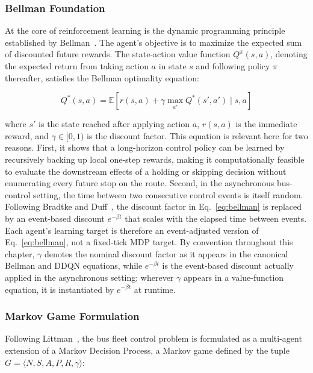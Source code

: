 \subsubsection{Bellman Foundation}

At the core of reinforcement learning is the dynamic programming principle established by Bellman~\cite{Bellman1957}. The agent's objective is to maximize the expected sum of discounted future rewards. The state-action value function $Q^\pi(s,a)$, denoting the expected return from taking action $a$ in state $s$ and following policy $\pi$ thereafter, satisfies the Bellman optimality equation:

\begin{equation}
Q^*(s, a) = \mathbb{E} \left[ r(s, a) + \gamma \max_{a'} Q^*(s', a') \mid s, a \right]
\label{eq:bellman}
\end{equation}

where $s'$ is the state reached after applying action $a$, $r(s,a)$ is the immediate reward, and $\gamma \in [0, 1)$ is the discount factor. This equation is relevant here for two reasons. First, it shows that a long-horizon control policy can be learned by recursively backing up local one-step rewards, making it computationally feasible to evaluate the downstream effects of a holding or skipping decision without enumerating every future stop on the route. Second, in the asynchronous bus-control setting, the time between two consecutive control events is itself random. Following Bradtke and Duff~\cite{Bradtke1995}, the discount factor in Eq.~\eqref{eq:bellman} is replaced by an event-based discount $e^{-\beta t}$ that scales with the elapsed time between events. Each agent's learning target is therefore an event-adjusted version of Eq.~\eqref{eq:bellman}, not a fixed-tick MDP target. By convention throughout this chapter, $\gamma$ denotes the nominal discount factor as it appears in the canonical Bellman and DDQN equations, while $e^{-\beta t}$ is the event-based discount actually applied in the asynchronous setting; wherever $\gamma$ appears in a value-function equation, it is instantiated by $e^{-\beta t}$ at runtime.


\subsubsection{Markov Game Formulation}

Following Littman~\cite{Littman1994}, the bus fleet control problem is formulated as a multi-agent extension of a Markov Decision Process, a Markov game defined by the tuple $G = \langle N, S, A, P, R, \gamma \rangle$:

